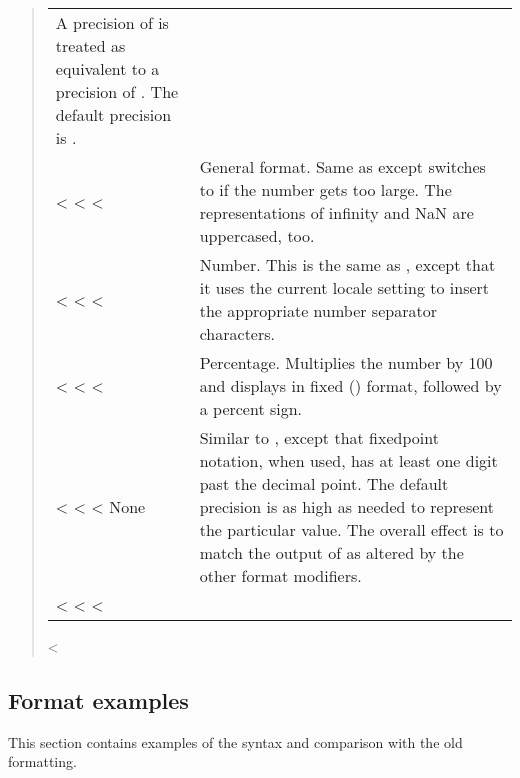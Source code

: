 \documentclass[letterpaper,10pt,english]{sphinxmanual}
\begin{document}
\begin{quote}
\begin{savenotes}
\begin{tabulary}{\linewidth}[t]{|T|T|}
A precision of  is treated as equivalent to a
precision of .  The default precision is .
\\<%
\sphinxhline<%
\hline<%
&
General format. Same as  except switches to
 if the number gets too large. The
representations of infinity and NaN are uppercased, too.
\\<%
\sphinxhline<%
\hline<%
&
Number. This is the same as , except that it uses
the current locale setting to insert the appropriate
number separator characters.
\\<%
\sphinxhline<%
\hline<%
\sphinxcode{\sphinxupquote{\textquotesingle{}\%\textquotesingle{}}}
&
Percentage. Multiplies the number by 100 and displays
in fixed () format, followed by a percent sign.
\\<%
\sphinxhline<%
\hline<%
None
&
Similar to , except that fixed\sphinxhyphen{}point notation,
when used, has at least one digit past the decimal point.
The default precision is as high as needed to represent
the particular value. The overall effect is to match the
output of  as altered by the other format
modifiers.
\\<%
\sphinxbottomrule<%
\hline<%
\end{tabulary}
<%
\sphinxattableend\end{savenotes}
\end{quote}


\subsection{Format examples}
\label{\detokenize{string:format-examples}}\label{\detokenize{string:formatexamples}}
This section contains examples of the  syntax and
comparison with the old \sphinxcode{\sphinxupquote{\%}}\sphinxhyphen{}formatting.
\end{document}
